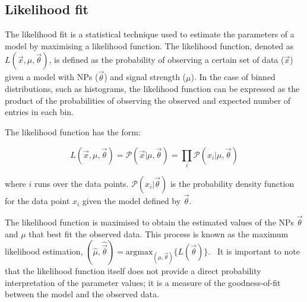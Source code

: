 \subsection{Likelihood fit} %
\label{sec:ChaptH:LikelihoodFit}

The likelihood fit is a statistical technique used to estimate the parameters of a model 
by maximising a likelihood function. %
The likelihood function, denoted as 
$L(\overrightarrow{x}, \mu , \overrightarrow{\theta})$, is defined as the probability of observing a certain set of 
data ($\overrightarrow{x}$) given a model with NPs ($\overrightarrow{\theta}$) and 
signal strength ($\mu$). In the 
case of binned distributions, such as histograms, the likelihood function can be 
expressed as the product of the probabilities of observing the observed and expected 
number of entries in each bin.

The likelihood function has the form:

\begin{minipage}[t]{0.6\textwidth}
\begin{equation*}
	L(\overrightarrow{x}, \mu , \overrightarrow{\theta}) = \mathcal{P}(\overrightarrow{x}| \mu ,\overrightarrow{\theta}) 
	= \prod_{i} \mathcal{P}(x_{i}| \mu ,\overrightarrow{\theta})
\end{equation*}
\end{minipage}\hfill
\begin{minipage}[t]{0.3\textwidth}
  \centering{}
\end{minipage}

\noindent where $i$ runs over the data points. 
$\mathcal{P}(x_{i}|\overrightarrow{\theta})$ is the probability density function for 
the data point $x_{i}$ given the model defined by $\overrightarrow{\theta}$.

The likelihood function is maximised to obtain the estimated values of the 
NPs $\overrightarrow{\theta}$ and $\mu$ that best fit the observed data. 
This process is known as the maximum likelihood estimation, 
\mbox{$(\hat{\mu}, \hat{\overrightarrow{\theta}}) = \text{argmax}_{(\mu, \overrightarrow{\theta})}\{L(\overrightarrow{\theta})\}$. }
It is important to note that the likelihood function itself does not provide a 
direct probability interpretation of the parameter values; it is a measure of
the goodness-of-fit between the model and the observed data.


